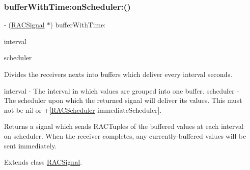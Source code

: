 \mbox{\label{category_r_a_c_signal_07_operations_08_a7f0cb2086a2123f40552d2eab2a9cc54}} 
\subsubsection{\texorpdfstring{buffer\+With\+Time\+:on\+Scheduler\+:()}{bufferWithTime:onScheduler:()}\hspace{0.1cm}{\footnotesize\ttfamily [2/3]}}
{\footnotesize\ttfamily -\/ (\mbox{\hyperlink{interface_r_a_c_signal}{R\+A\+C\+Signal}} $\ast$) buffer\+With\+Time\+: \begin{DoxyParamCaption}\item[{(N\+S\+Time\+Interval)}]{interval }\item[{onScheduler:(\mbox{\hyperlink{interface_r_a_c_scheduler}{R\+A\+C\+Scheduler}} $\ast$)}]{scheduler }\end{DoxyParamCaption}}

Divides the receiver\textquotesingle{}s {\ttfamily next}s into buffers which deliver every {\ttfamily interval} seconds.

interval -\/ The interval in which values are grouped into one buffer. scheduler -\/ The scheduler upon which the returned signal will deliver its values. This must not be nil or +\mbox{[}\mbox{\hyperlink{interface_r_a_c_scheduler}{R\+A\+C\+Scheduler}} immediate\+Scheduler\mbox{]}.

Returns a signal which sends R\+A\+C\+Tuples of the buffered values at each interval on {\ttfamily scheduler}. When the receiver completes, any currently-\/buffered values will be sent immediately. 

Extends class \mbox{\hyperlink{interface_r_a_c_signal_a7f0cb2086a2123f40552d2eab2a9cc54}{R\+A\+C\+Signal}}.

\mbox{\label{category_r_a_c_signal_07_operations_08_a7f0cb2086a2123f40552d2eab2a9cc54}} 
